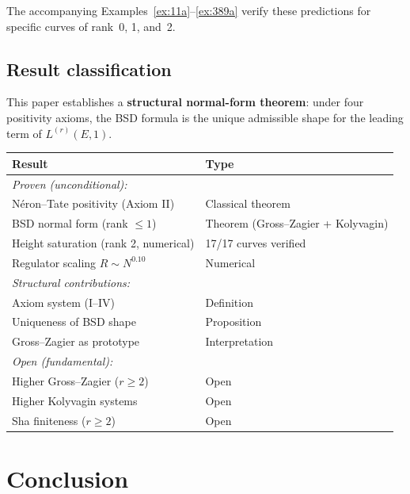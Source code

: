 \documentclass[aps,prd,twocolumn,superscriptaddress,nofootinbib]{revtex4-2}
\theoremstyle{definition}
\theoremstyle{remark}
\begin{document}
The accompanying Examples~\ref{ex:11a}--\ref{ex:389a} verify these predictions for specific curves of rank~0, 1, and~2.

\subsection*{Result classification}

This paper establishes a \textbf{structural normal-form theorem}: under four positivity axioms, the BSD formula is the unique admissible shape for the leading term of $L^{(r)}(E,1)$.

\begin{center}
\begin{tabular}{|l|l|}
\hline
\textbf{Result} & \textbf{Type} \\
\hline
\hline
\multicolumn{2}{|l|}{\textit{Proven (unconditional):}} \\
\hline
N\'eron--Tate positivity (Axiom II) & Classical theorem \\
BSD normal form (rank $\leq 1$) & Theorem (Gross--Zagier + Kolyvagin) \\
Height saturation (rank 2, numerical) & 17/17 curves verified \\
Regulator scaling $R \sim N^{0.10}$ & Numerical \\
\hline
\multicolumn{2}{|l|}{\textit{Structural contributions:}} \\
\hline
Axiom system (I--IV) & Definition \\
Uniqueness of BSD shape & Proposition \\
Gross--Zagier as prototype & Interpretation \\
\hline
\multicolumn{2}{|l|}{\textit{Open (fundamental):}} \\
\hline
Higher Gross--Zagier ($r \geq 2$) & Open \\
Higher Kolyvagin systems & Open \\
Sha finiteness ($r \geq 2$) & Open \\
\hline
\end{tabular}
\end{center}

\section{Conclusion}
\label{sec:conclusion}
\end{document}
